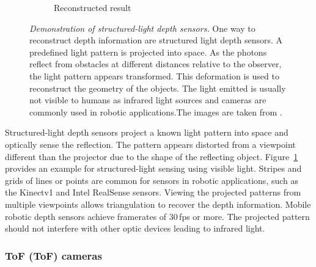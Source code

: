 \begin{figure}[H]
\begin{subfigure}[t]{0.45\textwidth}
        \caption{Reconstructed result}
    \end{subfigure}
    \caption[Demonstration of structured-light depth sensors]{\emph{Demonstration of structured-light depth sensors.} One way to reconstruct depth information are structured light depth sensors. A predefined light pattern is projected into space. As the photons reflect from obstacles at different distances relative to the observer, the light pattern appears transformed. This deformation is used to reconstruct the geometry of the objects. The light emitted is usually not visible to humans as infrared light sources and cameras are commonly used in robotic applications.The images are taken from \cite{sl_depthsensor_calibration}.}\label{fig:sl_face}
\end{figure}
Structured-light depth sensors project a known light pattern into space and optically sense the reflection.
The pattern appears distorted from a viewpoint different than the projector due to the shape of the reflecting object.
Figure~\ref{fig:sl_face} provides an example for structured-light sensing using visible light.
Stripes and grids of lines or points are common for sensors in robotic applications, such as the Kinectv1 and Intel RealSense\cite{intel_realsense} sensors.
Viewing the projected patterns from multiple viewpoints allows triangulation to recover the depth information.
Mobile robotic depth sensors achieve framerates of 30\,\acrshort{fps} or more.
The projected pattern should not interfere with other optic devices leading to infrared light.

\subsubsection{\acrlong{ToF} (\acrshort{ToF}) cameras}

